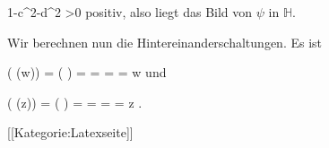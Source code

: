 \mavergleichskettedisp
{\vergleichskette
{ 1-c^2-d^2
}
{ >0} {
}
{ } {
}
{ } {
}
{ } {
}
}
{}{}{}
positiv, also liegt das Bild von $\psi$ in ${\mathbb H}$.

Wir berechnen nun die Hintereinanderschaltungen. Es ist

\mavergleichskettealign
{\vergleichskettealign
{ \varphi( \psi(w))
}
{ =} { \varphi \left(  \right)
}
{ =} { {  }
}
{ =} { {  }
}
{ =} { {  }
}
}
{
\vergleichskettefortsetzungalign
{ =} { w
}
{ } {}
{ } {}
{ } {}
}
{}{}
und

\mavergleichskettealign
{\vergleichskettealign
{ \psi( \varphi(z))
}
{ =} { \psi \left(  {  }  \right)
}
{ =} { {  }
}
{ =} { {  }
}
{ =} { {  }
}
}
{
\vergleichskettefortsetzungalign
{ =} { z
}
{ } {}
{ } {}
{ } {}
}
{}{.}

 [[Kategorie:Latexseite]]
